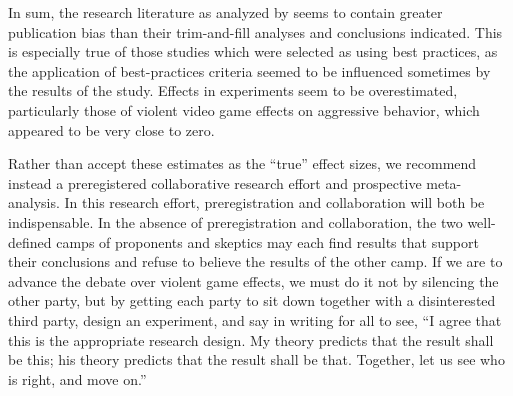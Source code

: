 \documentclass[man]{apa6}
\begin{document}
In sum, the research literature as analyzed by \citep{Anderson:etal:2010} seems to contain greater publication bias than their trim-and-fill analyses and conclusions indicated. This is especially true of those studies which were selected as using best practices, as the application of best-practices criteria seemed to be influenced sometimes by the results of the study. Effects in experiments seem to be overestimated, particularly those of violent video game effects on aggressive behavior, which appeared to be very close to zero. 

Rather than accept these estimates as the ``true'' effect sizes, we recommend instead a preregistered collaborative research effort and prospective meta-analysis. In this research effort, preregistration and collaboration will both be indispensable. In the absence of preregistration and collaboration, the two well-defined camps of proponents and skeptics may each find results that support their conclusions and refuse to believe the results of the other camp. If we are to advance the debate over violent game effects, we must do it not by silencing the other party, but by getting each party to sit down together with a disinterested third party, design an experiment, and say in writing for all to see, ``I agree that this is the appropriate research design. My theory predicts that the result shall be this; his theory predicts that the result shall be that. Together, let us see who is right, and move on.''


\end{document}
